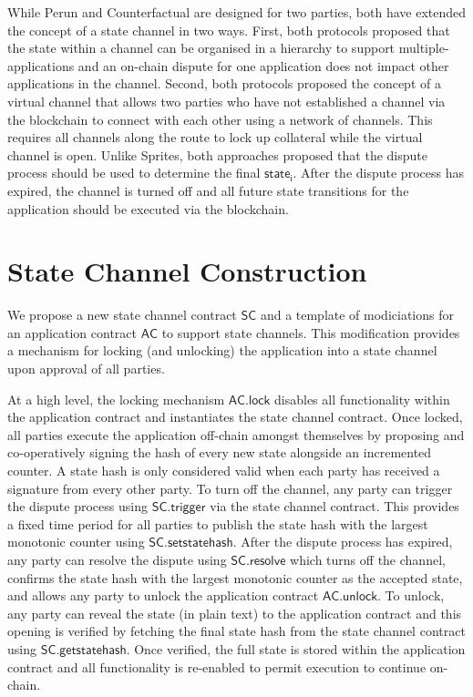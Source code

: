 \documentclass{llncs}
\newcommand{\stateinfoi}{\mathsf{state}_{\mathsf{i}}}
\newcommand{\statechannel}{\mathsf{SC}}
\newcommand{\statechanneldispute}{\mathsf{SC}.\mathsf{trigger}}
\newcommand{\statechannelsetstate}{\mathsf{SC}.\mathsf{setstatehash}}
\newcommand{\statechannelresolve}{\mathsf{SC}.\mathsf{resolve}}
\newcommand{\statechannelgetcommitment}{\mathsf{SC}.\mathsf{getstatehash}}
\newcommand{\appcontract}{\mathsf{AC}}
\newcommand{\applock}{\mathsf{AC.lock}}
\newcommand{\appunlock}{\mathsf{AC.unlock}}
\begin{document}
While Perun and Counterfactual are designed for two parties, both have extended the concept of a state channel in two ways. 
First, both protocols proposed that the state within a channel can be organised in a hierarchy to support multiple-applications and an on-chain dispute for one application does not impact other applications in the channel. 
Second, both protocols proposed the concept of a virtual channel that allows two parties who have not established a channel via the blockchain to connect with each other using a network of channels. This requires all channels along the route to lock up collateral while the virtual channel is open. 
Unlike Sprites, both approaches proposed that the dispute process should  be used to determine the final $\stateinfoi$.
After the dispute process has expired, the channel is turned off and all future state transitions for the application should be executed via the blockchain. 

\section{State Channel Construction} 

We propose a new state channel contract $\statechannel$ and a template of modiciations for an application contract $\appcontract$  to support state channels. 
This modification provides a mechanism for locking (and unlocking) the application into a state channel upon approval of all parties. 

At a high level, the locking mechanism $\applock$ disables all functionality within the application contract and instantiates the state channel contract. 
Once locked, all parties execute the application off-chain amongst themselves by proposing  and co-operatively signing the hash of every new state alongside an incremented counter. 
A state hash is only considered valid when each party has received a signature from every other party. 
To turn off the channel, any party can trigger the dispute process using $\statechanneldispute$ via the state channel contract.
This provides  a fixed time period  for all parties to publish the state hash with the largest monotonic counter using $\statechannelsetstate$. 
After the dispute process has expired, any party can resolve the dispute using $\statechannelresolve$ which turns off the channel, confirms the state hash with the largest monotonic counter as the accepted state, and allows any party to unlock the application contract $\appunlock$. 
To unlock, any party can reveal the state (in plain text) to the application contract and this opening is verified by fetching the final state hash from the state channel contract using  $\statechannelgetcommitment$. 
Once verified, the full state is stored within the application contract and all functionality is re-enabled to permit execution to continue on-chain. 
\end{document}
